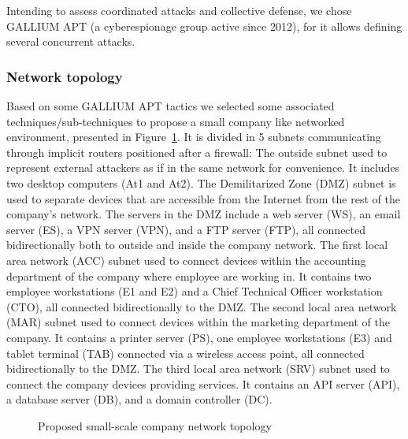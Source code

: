 \noindent
Intending to assess coordinated attacks and collective defense, we chose GALLIUM APT (a cyberespionage group active since 2012), for it allows defining several concurrent attacks.


\subsubsection{Network topology}


\noindent
Based on some GALLIUM APT tactics we selected some associated techniques/sub-techniques to propose a small company like networked environment, presented in Figure~\ref{fig:scenario_network_topology}. It is divided in 5 subnets communicating through implicit routers positioned after a firewall:
The outside subnet used to represent external attackers as if in the same network for convenience. It includes two desktop computers (At1 and At2).
The Demilitarized Zone (DMZ) subnet is used to separate devices that are accessible from the Internet from the rest of the company's network. The servers in the DMZ include a web server (WS), an email server (ES), a VPN server (VPN), and a FTP server (FTP), all connected bidirectionally both to outside and inside the company network.
The first local area network (ACC) subnet used to connect devices within the accounting department of the company where employee are working in. It contains two employee workstations (E1 and E2) and a Chief Technical Officer workstation (CTO), all connected bidirectionally to the DMZ. %
The second local area network (MAR) subnet used to connect devices within the marketing department of the company. It contains a printer server (PS), one employee workstations (E3) and tablet terminal (TAB) connected via a wireless access point, all connected bidirectionally to the DMZ. %
The third local area network (SRV) subnet used to connect the company devices providing services. It contains an API server (API), a database server (DB), and a domain controller (DC).

\begin{figure}
    \centering
    
    \caption{Proposed small-scale company network topology}
    \label{fig:scenario_network_topology}
\end{figure}


